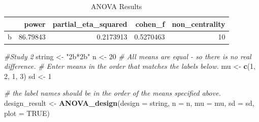 \documentclass[
]{book}
\newenvironment{Shaded}{\begin{snugshade}}{\end{snugshade}}
\newcommand{\CommentTok}[1]{\textcolor[rgb]{0.56,0.35,0.01}{\textit{#1}}}
\newcommand{\DataTypeTok}[1]{\textcolor[rgb]{0.13,0.29,0.53}{#1}}
\newcommand{\DecValTok}[1]{\textcolor[rgb]{0.00,0.00,0.81}{#1}}
\newcommand{\FloatTok}[1]{\textcolor[rgb]{0.00,0.00,0.81}{#1}}
\newcommand{\KeywordTok}[1]{\textcolor[rgb]{0.13,0.29,0.53}{\textbf{#1}}}
\newcommand{\NormalTok}[1]{#1}
\newcommand{\OperatorTok}[1]{\textcolor[rgb]{0.81,0.36,0.00}{\textbf{#1}}}
\newcommand{\OtherTok}[1]{\textcolor[rgb]{0.56,0.35,0.01}{#1}}
\newcommand{\StringTok}[1]{\textcolor[rgb]{0.31,0.60,0.02}{#1}}
\begin{document}
\begin{Shaded}
\end{Shaded}

\begin{table}[!h]

\caption{\label{tab:unnamed-chunk-216}ANOVA Results}
\centering
\begin{tabular}[t]{l|r|r|r|r}
\hline
  & power & partial\_eta\_squared & cohen\_f & non\_centrality\\
\hline
b & 86.79843 & 0.2173913 & 0.5270463 & 10\\
\hline
\end{tabular}
\end{table}

\begin{Shaded}
\begin{Highlighting}[]
\CommentTok{#Study 2}
\NormalTok{string <-}\StringTok{ "2b*2b"}
\NormalTok{n <-}\StringTok{ }\DecValTok{20}
\CommentTok{# All means are equal - so there is no real difference.}
\CommentTok{# Enter means in the order that matches the labels below.}
\NormalTok{mu <-}\StringTok{ }\KeywordTok{c}\NormalTok{(}\DecValTok{1}\NormalTok{, }\DecValTok{2}\NormalTok{, }\DecValTok{1}\NormalTok{, }\DecValTok{3}\NormalTok{) }
\NormalTok{sd <-}\StringTok{ }\DecValTok{1}

\CommentTok{# the label names should be in the order of the means specified above.}
\NormalTok{design_result <-}\StringTok{ }\KeywordTok{ANOVA_design}\NormalTok{(}\DataTypeTok{design =}\NormalTok{ string,}
                   \DataTypeTok{n =}\NormalTok{ n, }
                   \DataTypeTok{mu =}\NormalTok{ mu, }
                   \DataTypeTok{sd =}\NormalTok{ sd, }
                   \DataTypeTok{plot =} \OtherTok{TRUE}\NormalTok{)}
\end{Highlighting}
\end{Shaded}
\end{document}
